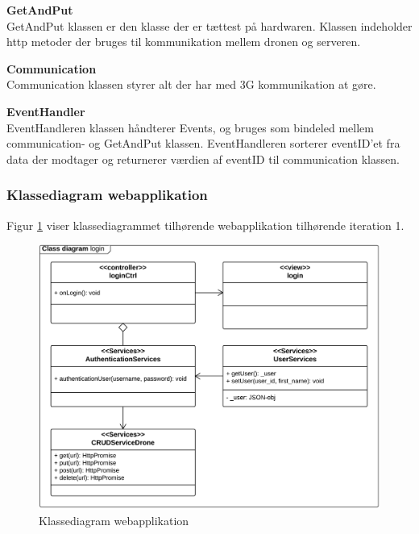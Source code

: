 \textbf{GetAndPut} \\
GetAndPut klassen er den klasse der er tættest på hardwaren. Klassen indeholder http metoder der bruges til kommunikation mellem dronen og serveren. 

\textbf{Communication} \\
Communication klassen styrer alt der har med 3G kommunikation at gøre.

\textbf{EventHandler} \\
EventHandleren klassen håndterer Events, og bruges som bindeled mellem communication- og GetAndPut klassen. EventHandleren sorterer eventID'et fra data der modtager og returnerer værdien af eventID til communication klassen. 


\newpage

\subsubsection*{Klassediagram webapplikation}
\vspace{-0.2cm}
Figur \ref{fig:classDiagram_webapplikation} viser klassediagrammet tilhørende webapplikation tilhørende iteration 1.
\vspace{-0.2cm}
\begin{figure}[H]
	\centering
	\includegraphics[width=1\textwidth]{Billeder/klasse_diagrammer/login_class_diagram.png}
	\vspace{-0.5cm}
	\caption{Klassediagram webapplikation}
	\label{fig:classDiagram_webapplikation}
\end{figure}

\vspace{-0.2cm}

